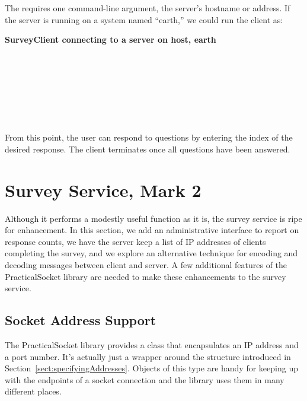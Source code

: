 \noindent
The  requires one command-line argument, the
server's hostname or address.  If the server is running on a system
named ``earth,'' we could run the client as:

\noindent \textbf{SurveyClient connecting to a server on host, earth}
\begin{shell}
\prompt {} \\
\\
\\
\\
\\
\response{> }\\
\end{shell}

\noindent
From this point, the user can respond to questions by entering the
index of the desired response.  The client terminates once all
questions have been answered.

\section{Survey Service, Mark 2}

Although it performs a modestly useful function as it is, the survey
service is ripe for enhancement.  In this section, we add an
administrative interface to report on response counts, we have the
server keep a list of IP addresses of clients completing the survey,
and we explore an alternative technique for encoding and decoding
messages between client and server.  A few additional features of the
PracticalSocket library are needed to make these enhancements to the
survey service.

\subsection{Socket Address Support}

The PracticalSocket library provides a  class that
encapsulates an IP address and a port number.  It's actually just a
wrapper around the  structure introduced in
Section~\ref{sect:specifyingAddresses}.  Objects of this type are
handy for keeping up with the endpoints of a socket connection and the
library uses them in many different places.


